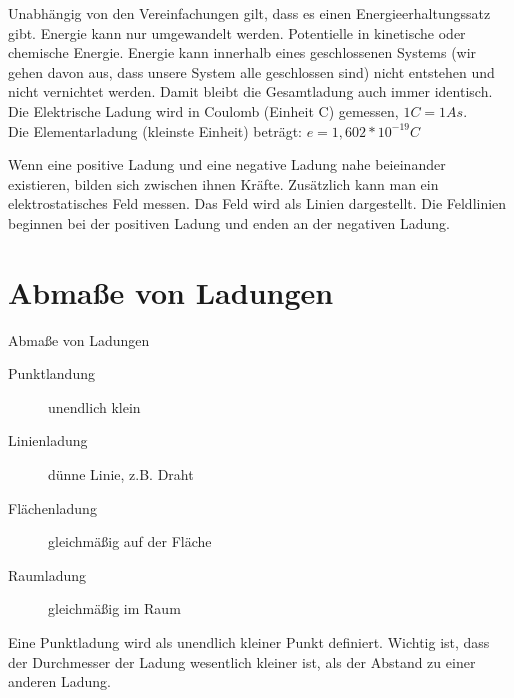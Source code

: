 \documentclass[aspectratio=169, ignorenonframetext]{beamer}
\begin{document}
Unabhängig von den Vereinfachungen gilt, dass es einen Energieerhaltungssatz gibt. Energie kann nur umgewandelt werden. Potentielle in kinetische oder chemische Energie. Energie kann innerhalb eines geschlossenen Systems (wir gehen davon aus, dass unsere System alle geschlossen sind) nicht entstehen und nicht vernichtet werden. Damit bleibt die Gesamtladung auch immer identisch. Die Elektrische Ladung wird in Coulomb (Einheit C) gemessen, $1 C = 1 As$. \\ Die Elementarladung (kleinste Einheit) beträgt: $e = 1,602 * 10^{-19} C$

Wenn eine positive Ladung und eine negative Ladung nahe beieinander existieren, bilden sich zwischen ihnen Kräfte. Zusätzlich kann man ein elektrostatisches Feld messen. Das Feld wird als Linien dargestellt. Die Feldlinien beginnen bei der positiven Ladung und enden an der negativen Ladung.

\section[Ladungen]{Abmaße von Ladungen}

\begin{frame}{Abmaße von Ladungen}
  \begin{description}
    \item[Punktlandung] unendlich klein
    \item[Linienladung] dünne Linie, z.B. Draht
    \item[Flächenladung] gleichmäßig auf der Fläche
    \item[Raumladung] gleichmäßig im Raum
  \end{description}
\end{frame}
Eine Punktladung wird als unendlich kleiner Punkt definiert. Wichtig ist, dass der Durchmesser der Ladung wesentlich kleiner ist, als der Abstand zu einer anderen Ladung.
\end{document}

